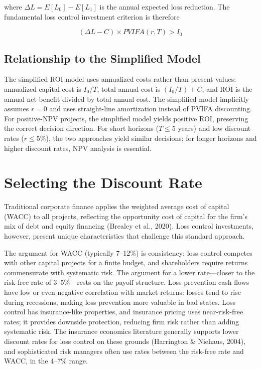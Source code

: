 \documentclass[11pt,openany]{book}
\begin{document}
where \(\Delta L = E[L_0] - E[L_1]\) is the annual expected loss reduction.
The fundamental loss control investment criterion is therefore

\[
(\Delta L - C) \times PVIFA(r,T) > I_0
\]

\subsection{Relationship to the Simplified Model}

The simplified ROI model uses annualized costs rather than present values:
annualized capital cost is \(I_0/T\), total annual cost is \((I_0/T) + C\),
and ROI is the annual net benefit divided by total annual cost. The simplified
model implicitly assumes \(r = 0\) and uses straight-line amortization instead
of PVIFA discounting. For positive-NPV projects, the simplified model yields
positive ROI, preserving the correct decision direction. For short horizons
(\(T \le 5\) years) and low discount rates (\(r \le 5\%\)), the two approaches
yield similar decisions; for longer horizons and higher discount rates, NPV
analysis is essential.

\section{Selecting the Discount Rate}
\label{sec:appendix-discount}

Traditional corporate finance applies the weighted average cost of capital
(WACC) to all projects, reflecting the opportunity cost of capital for the
firm's mix of debt and equity financing (Brealey et al., 2020). Loss control
investments, however, present unique characteristics that challenge this
standard approach.

The argument for WACC (typically 7--12\%) is consistency: loss control
competes with other capital projects for a finite budget, and shareholders
require returns commensurate with systematic risk. The argument for a lower
rate---closer to the risk-free rate of 3--5\%---rests on the payoff structure.
Loss-prevention cash flows have low or even negative correlation with market
returns: losses tend to rise during recessions, making loss prevention more
valuable in bad states. Loss control has insurance-like properties, and
insurance pricing uses near-risk-free rates; it provides downside protection,
reducing firm risk rather than adding systematic risk. The insurance economics
literature generally supports lower discount rates for loss control on these
grounds (Harrington \& Niehaus, 2004), and sophisticated risk managers often
use rates between the risk-free rate and WACC, in the 4--7\% range.
\end{document}
